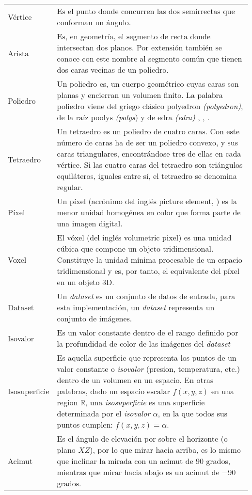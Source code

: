 \begin{table}[h!t]
	\begin{tabular}{lp{11cm}}
	Vértice   & Es el punto donde concurren las dos semirrectas que conforman un ángulo.\\

	Arista    & Es, en geometría, el segmento de recta donde intersectan dos planos. Por extensión también se conoce con este
			nombre al segmento común que tienen dos caras vecinas de un poliedro.\\

	Poliedro  & Un poliedro es, un cuerpo geométrico cuyas caras son planas y encierran un volumen finito. La palabra poliedro
			viene del griego clásico \textgreek{polyedron} \emph{(polyedron)}, de la raíz \textgreek{poolys} \emph{(polys})
			\jcq{muchas} y de \textgreek{edra} \emph{(edra)} \jcq{base}, \jcq{asiento}, \jcq{cara}.\\

	Tetraedro & Un tetraedro es un poliedro de cuatro caras. Con este número de caras ha de ser un
			poliedro convexo, y sus caras triangulares, encontrándose tres de ellas en cada vértice. Si las
			cuatro caras del tetraedro son triángulos equiláteros, iguales entre sí, el tetraedro se denomina
			regular.\\

	Píxel     & Un píxel (acrónimo del inglés picture element, \jcq{elemento de imagen}) es la menor unidad homogénea en color
			que forma parte de una imagen digital.\\

	Voxel     & El vóxel (del inglés volumetric pixel) es una unidad cúbica que compone un objeto
			tridimensional. Constituye la unidad mínima procesable de un espacio tridimensional y es, por
			tanto, el equivalente del píxel en un objeto 3D.\\

	Dataset   & Un \emph{dataset} es un conjunto de datos de entrada, para esta
			implementación, un \emph{dataset} representa un conjunto de imágenes.\\

	Isovalor	& Es un valor constante dentro de el rango definido por la profundidad de 					color de las imágenes del \emph{dataset}\\

	Isosuperficie	& Es aquella superficie que representa los puntos de un valor constante o \emph{isovalor} (presion, temperatura, etc.) dentro de un volumen en un espacio. En otras palabras, dado un espacio escalar $f(x,y,z)$ en una region $\mathbb{R}$, una \emph{isosuperficie} es una superficie determinada por el \emph{isovalor} $\alpha$, en la que todos sus puntos cumplen: $f(x,y,z) = \alpha$.\\

	Acimut	& Es el ángulo de elevación por sobre el horizonte (o plano $XZ$), por lo que mirar hacia arriba, es lo mismo que inclinar la mirada con un acimut de $90$ grados, mientras que mirar hacia abajo es un acimut de $-90$ grados.\\

	\end{tabular}
\end{table}
